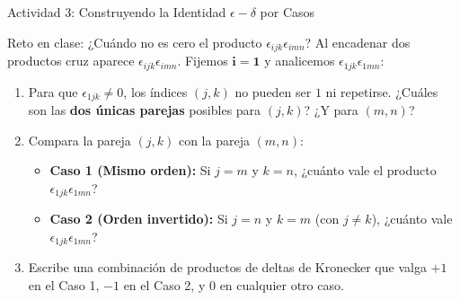 \documentclass[10pt,aspectratio=169]{beamer}
\begin{document}
\begin{frame}{Actividad 3: Construyendo la Identidad $\epsilon-\delta$ por Casos}
  \begin{block}{Reto en clase: ¿Cuándo no es cero el producto $\epsilon_{ijk}\epsilon_{imn}$?}
    \small
    Al encadenar dos productos cruz aparece $\epsilon_{ijk}\epsilon_{imn}$. Fijemos $\mathbf{i = 1}$ y analicemos $\epsilon_{1jk}\epsilon_{1mn}$:
    \begin{enumerate}
      \item[(a)] Para que $\epsilon_{1jk} \neq 0$, los índices $(j, k)$ no pueden ser $1$ ni repetirse. ¿Cuáles son las \textbf{dos únicas parejas} posibles para $(j, k)$? ¿Y para $(m, n)$?
      \item[(b)] Compara la pareja $(j, k)$ con la pareja $(m, n)$:
      \begin{itemize}
        \item \textbf{Caso 1 (Mismo orden):} Si $j = m$ y $k = n$, ¿cuánto vale el producto $\epsilon_{1jk}\epsilon_{1mn}$?
        \item \textbf{Caso 2 (Orden invertido):} Si $j = n$ y $k = m$ (con $j \neq k$), ¿cuánto vale $\epsilon_{1jk}\epsilon_{1mn}$?
      \end{itemize}
      \item[(c)] Escribe una combinación de productos de deltas de Kronecker que valga $+1$ en el Caso 1, $-1$ en el Caso 2, y $0$ en cualquier otro caso.
    \end{enumerate}
  \end{block}
\end{frame}
\end{document}
